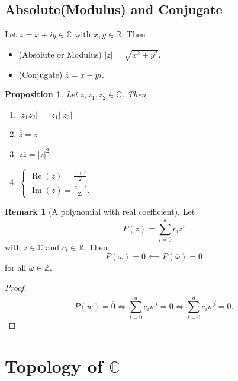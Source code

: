 \documentclass[12pt,openany]{book}
\newtheorem{proposition}[theorem]{Proposition}
\theoremstyle{definition}
\newtheorem{remark}{Remark}[section]
\newcommand{\Z}{\mathbb{Z}}
\newcommand{\R}{\mathbb{R}}
\newcommand{\C}{\mathbb{C}}
\newcommand{\abs}[1]{\left\lvert #1 \right\rvert}
\newcommand{\conjugate}[1]{\overline{#1}}
\renewcommand{\Re}{\operatorname{Re}}
\renewcommand{\Im}{\operatorname{Im}}
\begin{document}
	\newpage
	\subsection{Absolute(Modulus) and Conjugate}
	Let $z=x+iy\in\C$ with $x,y\in\R$. Then \begin{itemize}
		\item (Absolute or Modulus) $\abs{z}=\sqrt{x^2+y^2}$.
		\item (Conjugate) $\conjugate{z}=x-yi$.
	\end{itemize}
	\vspace{8pt}
	\begin{tcolorbox}[colback=white,colframe=procolor, title={\color{white}\bf }]
		\begin{proposition}
			Let $z,z_1,z_2\in\C$. Then\begin{enumerate}
				\item $\abs{z_1z_2}=\abs{z_1}\abs{z_2}$
				\item $\conjugate{\conjugate{z}}=z$
				\item $\boxed{z\conjugate{z}=\abs{z}^2}$
				\item $\begin{cases}
					\Re(z)=\frac{z+\conjugate{z}}{2}\\
					\Im(z)=\frac{z-\conjugate{z}}{2i}.
				\end{cases}$
			\end{enumerate}
		\end{proposition}
	\end{tcolorbox}
	\vspace{8pt}
	\begin{remark}[A polynomial with real coefficient]
		Let \[
		P(z)=\sum_{i=0}^dc_iz^i
		\] with $z\in\C$ and $c_i\in\R$. Then \[
		P(\omega)=0\impliedby P(\conjugate{\omega})=0
		\] for all $\omega\in\Z$.
		\begin{proof}
			\[
			\conjugate{P(w)}=\conjugate{0}\iff\conjugate{\sum_{i=0}^dc_iw^i}=0\iff\sum_{i=0}^dc_i\conjugate{w}^i=0.
			\]
		\end{proof}
	\end{remark}

	\newpage
	\section{Topology of $\C$}
	
\end{document}
